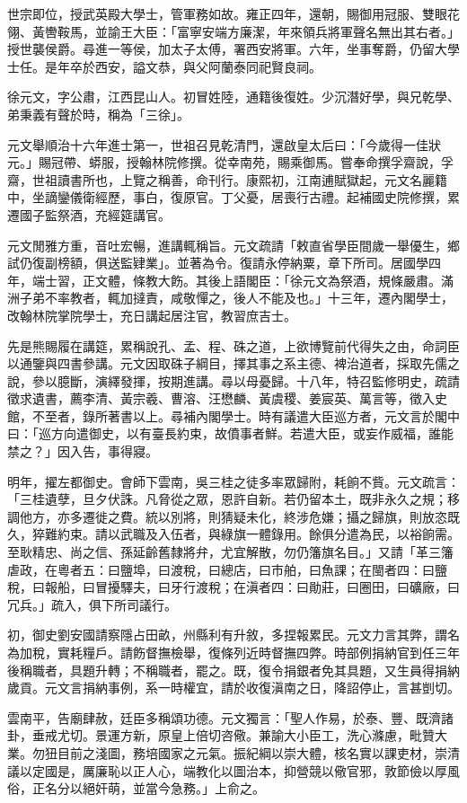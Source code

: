 \begin{pinyinscope}
世宗即位，授武英殿大學士，管軍務如故。雍正四年，還朝，賜御用冠服、雙眼花翎、黃轡鞍馬，並諭王大臣：「富寧安端方廉潔，年來領兵將軍聲名無出其右者。」授世襲侯爵。尋進一等侯，加太子太傅，署西安將軍。六年，坐事奪爵，仍留大學士任。是年卒於西安，謚文恭，與父阿蘭泰同祀賢良祠。

徐元文，字公肅，江西昆山人。初冒姓陸，通籍後復姓。少沉潛好學，與兄乾學、弟秉義有聲於時，稱為「三徐」。

元文舉順治十六年進士第一，世祖召見乾清門，還啟皇太后曰：「今歲得一佳狀元。」賜冠帶、蟒服，授翰林院修撰。從幸南苑，賜乘御馬。嘗奉命撰孚齋說，孚齋，世祖讀書所也，上覽之稱善，命刊行。康熙初，江南逋賦獄起，元文名麗籍中，坐謫鑾儀衛經歷，事白，復原官。丁父憂，居喪行古禮。起補國史院修撰，累遷國子監祭酒，充經筵講官。

元文閒雅方重，音吐宏暢，進講輒稱旨。元文疏請「敕直省學臣間歲一舉優生，鄉試仍復副榜額，俱送監肄業」。並著為令。復請永停納粟，章下所司。居國學四年，端士習，正文體，條教大飭。其後上語閣臣：「徐元文為祭酒，規條嚴肅。滿洲子弟不率教者，輒加撻責，咸敬憚之，後人不能及也。」十三年，遷內閣學士，改翰林院掌院學士，充日講起居注官，教習庶吉士。

先是熊賜履在講筵，累稱說孔、孟、程、硃之道，上欲博覽前代得失之由，命詞臣以通鑒與四書參講。元文因取硃子綱目，擇其事之系主德、裨治道者，採取先儒之說，參以臆斷，演繹發揮，按期進講。尋以母憂歸。十八年，特召監修明史，疏請徵求遺書，薦李清、黃宗羲、曹溶、汪懋麟、黃虞稷、姜宸英、萬言等，徵入史館，不至者，錄所著書以上。尋補內閣學士。時有議遣大臣巡方者，元文言於閣中曰：「巡方向遣御史，以有臺長約束，故僨事者鮮。若遣大臣，或妄作威福，誰能禁之？」因入告，事得寢。

明年，擢左都御史。會師下雲南，吳三桂之徒多率眾歸附，耗餉不貲。元文疏言：「三桂遺孽，旦夕伏誅。凡脅從之眾，恩許自新。若仍留本土，既非永久之規；移調他方，亦多遷徙之費。統以別將，則猜疑未化，終涉危嫌；攝之歸旗，則放恣既久，猝難約束。請以武職及入伍者，與綠旗一體錄用。餘俱分遣為民，以裕餉需。至耿精忠、尚之信、孫延齡舊隸將弁，尤宜解散，勿仍籓旗名目。」又請「革三籓虐政，在粵者五：曰鹽埠，曰渡稅，曰總店，曰市舶，曰魚課；在閩者四：曰鹽稅，曰報船，曰冒擾驛夫，曰牙行渡稅；在滇者四：曰勛莊，曰圈田，曰礦廠，曰冗兵。」疏入，俱下所司議行。

初，御史劉安國請察隱占田畝，州縣利有升敘，多捏報累民。元文力言其弊，謂名為加稅，實耗糧戶。請飭督撫檢舉，復條列近時督撫四弊。時部例捐納官到任三年後稱職者，具題升轉；不稱職者，罷之。既，復令捐銀者免其具題，又生員得捐納歲貢。元文言捐納事例，系一時權宜，請於收復滇南之日，降詔停止，言甚剴切。

雲南平，告廟肆赦，廷臣多稱頌功德。元文獨言：「聖人作易，於泰、豐、既濟諸卦，垂戒尤切。景運方新，原皇上倍切咨儆。兼諭大小臣工，洗心滌慮，毗贊大業。勿狃目前之淺圖，務培國家之元氣。振紀綱以崇大體，核名實以課吏材，崇清議以定國是，厲廉恥以正人心，端教化以圖治本，抑營競以儆官邪，敦節儉以厚風俗，正名分以絕奸萌，並當今急務。」上俞之。


\end{pinyinscope}
